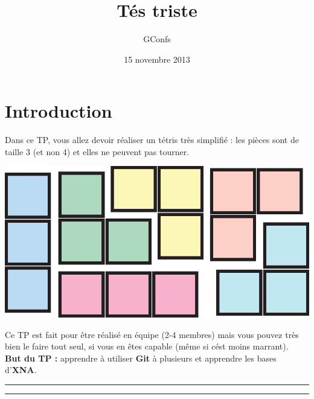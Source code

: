\documentclass[a4paper]{article}
\title{Tés triste}
\author{
    GConfs
}
\date{15 novembre 2013}
\begin{document}
\color{foreground}

%
\begin{center}
\end{center}

\section*{Introduction}

Dans ce TP, vous allez devoir réaliser un tétris très simplifié : les pièces
sont de taille 3 (et non 4) et elles ne peuvent pas tourner. \\

\begin{center}
    \includegraphics[scale=0.5]{img/pieces.eps}
\end{center}

Ce TP est fait pour être réalisé en équipe (2-4 membres) mais vous pouvez très
bien le faire tout seul, si vous en êtes capable (même si cést moins marrant).
\\

\textbf{But du TP :} apprendre à utiliser \textbf{Git} à plusieurs et apprendre
les bases d'\textbf{XNA}.

\begin{center}\noindent\rule{12cm}{0.4pt}\end{center}

\tableofcontents

\begin{center}\noindent\rule{12cm}{0.4pt}\end{center}
\end{document}
